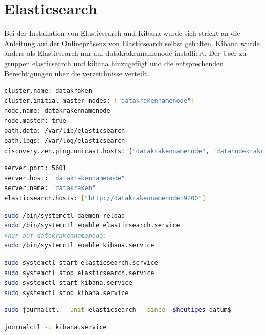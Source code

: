 \documentclass[12pt,oneside,a4paper,parskip]{scrbook}
\begin{document}
\pagebreak

\section{Elasticsearch}
Bei der Installation von Elasticsearch und Kibana wurde sich strickt an die Anleitung auf der Onlinepräsenz von Elasticsearch selbst gehalten. Kibana wurde anders als Elasticsearch nur auf datakrakennamenode installiert.
Der User zu gruppen elasticsearch und kibana hinzugefügt und die entsprechenden Berechtigungen über die verzeichnisse verteilt.

\begin{lstlisting}[caption=elasticsearch.yml,label=elasticyml,language=bash]
cluster.name: datakraken
cluster.initial_master_nodes: ["datakrakennamenode"]
node.name: datakrakennamenode
node.master: true
path.data: /var/lib/elasticsearch
path.logs: /var/log/elasticsearch
discovery.zen.ping.unicast.hosts: ["datakrakennamenode", "datanodekraken1", "datanodekraken2"]
\end{lstlisting}

\begin{lstlisting}[caption=kibana.yml,label=kibanayml,language=bash]
server.port: 5601
server.host: "datakrakennamenode"
server.name: "datakraken"
elasticsearch.hosts: ["http://datakrakennamenode:9200"]
\end{lstlisting}


\begin{lstlisting}[caption=Setup zum automatischen Start mit jedem Boot, label=boot,language=bash]
sudo /bin/systemctl daemon-reload
sudo /bin/systemctl enable elasticsearch.service
#nur auf datakrakennamenode:
sudo /bin/systemctl enable kibana.service
\end{lstlisting}
\begin{lstlisting}[caption=Manuelles Starten/ Stoppen von Elasticsearch/Kibana,label=startstopelastic,language=bash]
sudo systemctl start elasticsearch.service
sudo systemctl stop elasticsearch.service
sudo systemctl start kibana.service
sudo systemctl stop kibana.service
\end{lstlisting}


\begin{lstlisting}[caption=Befehl zum durchsuchen der Logdaten,label=logelastic,language=bash]
sudo journalctl --unit elasticsearch --since  $heutiges datum$
\end{lstlisting}

\begin{lstlisting}[caption=Befehl zum durchsuchen der Logdaten,label=logkibana,language=bash]
journalctl -u kibana.service
\end{lstlisting}
\end{document}
